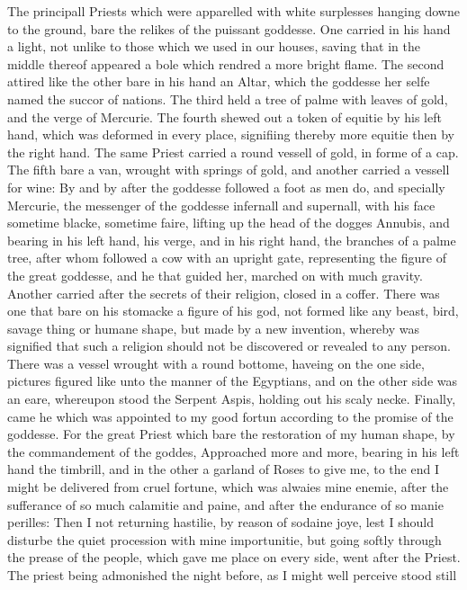 The principall Priests which were apparelled with white surplesses hanging
downe to the ground, bare the relikes of the puissant goddesse. One carried in
his hand a light, not unlike to those which we used in our houses, saving that
in the middle thereof appeared a bole which rendred a more bright flame. The
second attired like the other bare in his hand an Altar, which the goddesse her
selfe named the succor of nations. The third held a tree of palme with leaves
of gold, and the verge of Mercurie. The fourth shewed out a token of equitie by
his left hand, which was deformed in every place, signifiing thereby more
equitie then by the right hand. The same Priest carried a round vessell of
gold, in forme of a cap. The fifth bare a van, wrought with springs of gold,
and another carried a vessell for wine: By and by after the goddesse followed a
foot as men do, and specially Mercurie, the messenger of the goddesse infernall
and supernall, with his face sometime blacke, sometime faire, lifting up the
head of the dogges Annubis, and bearing in his left hand, his verge, and in his
right hand, the branches of a palme tree, after whom followed a cow with an
upright gate, representing the figure of the great goddesse, and he that guided
her, marched on with much gravity. Another carried after the secrets of their
religion, closed in a coffer. There was one that bare on his stomacke a figure
of his god, not formed like any beast, bird, savage thing or humane shape, but
made by a new invention, whereby was signified that such a religion should not
be discovered or revealed to any person. There was a vessel wrought with a
round bottome, haveing on the one side, pictures figured like unto the manner
of the Egyptians, and on the other side was an eare, whereupon stood the
Serpent Aspis, holding out his scaly necke. Finally, came he which was
appointed to my good fortun according to the promise of the goddesse. For the
great Priest which bare the restoration of my human shape, by the commandement
of the goddes, Approached more and more, bearing in his left hand the timbrill,
and in the other a garland of Roses to give me, to the end I might be delivered
from cruel fortune, which was alwaies mine enemie, after the sufferance of so
much calamitie and paine, and after the endurance of so manie perilles: Then I
not returning hastilie, by reason of sodaine joye, lest I should disturbe the
quiet procession with mine importunitie, but going softly through the prease of
the people, which gave me place on every side, went after the Priest. The
priest being admonished the night before, as I might well perceive stood still
